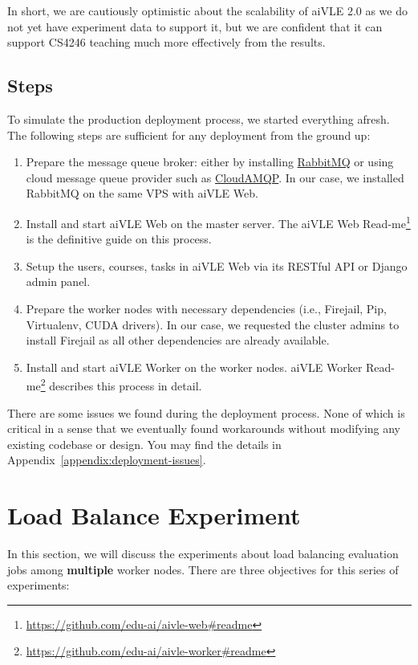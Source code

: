 In short, we are cautiously optimistic about the scalability of aiVLE 2.0 as we do not yet have experiment data to support it, but we are confident that it can support CS4246 teaching much more effectively from the results.

\subsection{Steps}
To simulate the production deployment process, we started everything afresh. The following steps are sufficient for any deployment from the ground up:

\begin{enumerate}
    \item Prepare the message queue broker: either by installing \href{https://www.rabbitmq.com/}{RabbitMQ} or using cloud message queue provider such as \href{https://www.cloudamqp.com/}{CloudAMQP}. In our case, we installed RabbitMQ on the same VPS with aiVLE Web.
    \item Install and start aiVLE Web on the master server.  The aiVLE Web Read-me\footnote{\href{https://github.com/edu-ai/aivle-web\#readme}{https://github.com/edu-ai/aivle-web\#readme}} is the definitive guide on this process.
    \item Setup the users, courses, tasks in aiVLE Web via its RESTful API or Django admin panel.
    \item Prepare the worker nodes with necessary dependencies (i.e., Firejail, Pip, Virtualenv, CUDA drivers). In our case, we requested the cluster admins to install Firejail as all other dependencies are already available.
    \item Install and start aiVLE Worker on the worker nodes. aiVLE Worker Read-me\footnote{\href{https://github.com/edu-ai/aivle-worker\#readme}{https://github.com/edu-ai/aivle-worker\#readme}} describes this process in detail.
\end{enumerate}

There are some issues we found during the deployment process. None of which is critical in a sense that we eventually found workarounds without modifying any existing codebase or design. You may find the details in Appendix~\ref{appendix:deployment-issues}.

\section{Load Balance Experiment}
\label{s:load-balance-exp}
In this section, we will discuss the experiments about load balancing evaluation jobs among \textbf{multiple} worker nodes. There are three objectives for this series of experiments:

